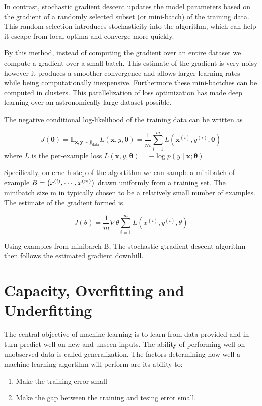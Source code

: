 \documentclass{report}
\begin{document}
In contrast, stochastic gradient descent updates the model parameters based on the gradient of a randomly selected subset (or mini-batch) of the training data. This random selection introduces stochasticity into the algorithm, which can help it escape from local optima and converge more quickly.

By this method, instead of computing the gradient over an entire dataset we compute a gradient over a small batch. This estimate of the gradient is very noisy however it produces a smoother convergence and allows larger learning rates while being computationally inexpensive. Furthermore these mini-bactches can be computed in clusters. This parallelization of loss optimization has made deep learning over an astronomically large dataset possible.

The negative conditional log-likelihood of the training data can be written as

$$
J(\boldsymbol{\theta})=\mathbb{E}_{\mathbf{x}, \mathbf{y} \sim \hat{p}_{\mathrm{data}}} L(\boldsymbol{x}, y, \boldsymbol{\theta})=\frac{1}{m} \sum_{i=1}^m L\left(\boldsymbol{x}^{(i)}, y^{(i)}, \boldsymbol{\theta}\right)
$$
where $L$ is the per-example loss $L(\boldsymbol{x}, y, \boldsymbol{\theta})=-\log p(y \mid \boldsymbol{x} ; \boldsymbol{\theta})$

Specifically, on erac h step of the algortithm we can sample a minibatch of example $B = \left(x^{(i)}, \cdots , x^{(m)}\right)$ drawn uniformly from a training set. The minibatch size m in typically chosen to be a relatively small number of examples. The estimate of the gradient formed is

$$J(\theta) = \frac{1}{m} \nabla \theta \sum_{i=1}^m L(x^{(i)}, y^{(i)}, \theta)$$

Using examples from minibarch B, The stochastic gtradient descent algorithm then follows the estimated gradient downhill.

\section{Capacity, Overfitting and Underfitting}
The central objective of machine learning is to learn from data provided and in turn predict well on new and unseen inputs. The ability of performing well on unobserved data is called generalization. The factors determining how well a machine learning algortihm will perform are its ability to:
\begin{enumerate}
	\item Make the training error small 
	\item Make the gap between the training and tesing error small.
\end{enumerate}
\end{document}

